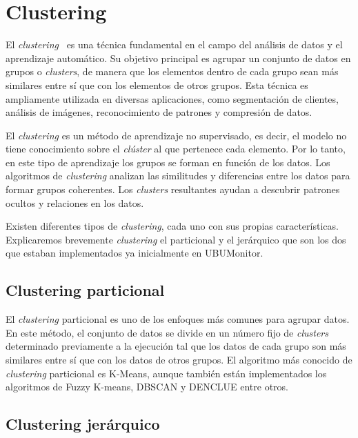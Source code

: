 
\section{Clustering}

El \emph{clustering}~\cite{immune:clustering} es una técnica fundamental en el campo del análisis de datos y el aprendizaje automático. Su objetivo principal es agrupar un conjunto de datos en grupos o \emph{\emph{clusters}}, de manera que los elementos dentro de cada grupo sean más similares entre sí que con los elementos de otros grupos. Esta técnica es ampliamente utilizada en diversas aplicaciones, como segmentación de clientes, análisis de imágenes, reconocimiento de patrones y compresión de datos.

El \emph{clustering} es un método de aprendizaje no supervisado, es decir, el modelo no tiene conocimiento sobre el \emph{clúster} al que pertenece cada elemento. Por lo tanto, en este tipo de aprendizaje los grupos se forman en función de los datos. Los algoritmos de \emph{clustering} analizan las similitudes y diferencias entre los datos para formar grupos coherentes. Los \emph{clusters} resultantes ayudan a descubrir patrones ocultos y relaciones en los datos.

Existen diferentes tipos de \emph{clustering}, cada uno con sus propias características. Explicaremos brevemente \emph{clustering} el particional y el jerárquico que son los dos que estaban implementados ya inicialmente en UBUMonitor.

\subsection{Clustering particional}

El \emph{clustering} particional es uno de los enfoques más comunes para agrupar datos. En este método, el conjunto de datos se divide en un número fijo de \emph{clusters} determinado previamente a la ejecución tal que los datos de cada grupo son más similares entre sí que con los datos de otros grupos. El algoritmo más conocido de \emph{clustering} particional es K-Means, aunque también están implementados los algoritmos de Fuzzy K-means, DBSCAN y DENCLUE entre otros.

\subsection{Clustering jerárquico}

